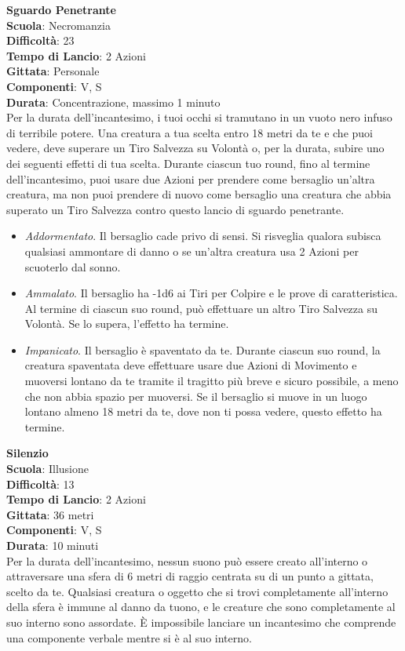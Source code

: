 \begin{multicols}{2}
\medskip\textbf{Sguardo Penetrante}\\
\textbf{Scuola}: Necromanzia\\
\textbf{Difficoltà}:  23\\
\textbf{Tempo di Lancio}: 2 Azioni\\
\textbf{Gittata}: Personale\\
\textbf{Componenti}: V, S\\
\textbf{Durata}: Concentrazione, massimo 1 minuto\\
Per la durata dell'incantesimo, i tuoi occhi si tramutano in un vuoto nero infuso di terribile potere. Una creatura a tua scelta entro 18 metri da te e che puoi vedere, deve superare un Tiro Salvezza su Volontà o, per la durata, subire uno dei seguenti effetti di tua scelta. Durante ciascun tuo round, fino al termine dell'incantesimo, puoi usare due Azioni per prendere come bersaglio un'altra creatura, ma non puoi prendere di nuovo come bersaglio una creatura che abbia superato un Tiro Salvezza contro questo lancio di sguardo penetrante.\\
\medskip
\begin{itemize}
\item
\textit{Addormentato}. Il bersaglio cade privo di sensi. Si risveglia qualora subisca qualsiasi ammontare di danno o se un'altra creatura usa 2 Azioni per scuoterlo dal sonno.
\item
\textit{Ammalato}. Il bersaglio ha -1d6 ai Tiri per Colpire e le prove di caratteristica. Al termine di ciascun suo round, può effettuare un altro Tiro Salvezza su Volontà. Se lo supera, l’effetto ha termine.
\item
\textit{Impanicato}. Il bersaglio è spaventato da te. Durante ciascun suo round, la creatura spaventata deve effettuare usare due Azioni di Movimento e muoversi lontano da te tramite il tragitto più breve e sicuro possibile, a meno che non abbia spazio per muoversi. Se il bersaglio si muove in un luogo lontano almeno 18 metri da te, dove non ti possa vedere, questo effetto ha termine.
\end{itemize}

\medskip\textbf{Silenzio}\\
\textbf{Scuola}: Illusione\\
\textbf{Difficoltà}:  13\\
\textbf{Tempo di Lancio}: 2 Azioni\\
\textbf{Gittata}: 36 metri\\
\textbf{Componenti}: V, S\\
\textbf{Durata}: 10 minuti\\
Per la durata dell'incantesimo, nessun suono può essere creato all'interno o attraversare una sfera di 6 metri di raggio centrata su di un punto a gittata, scelto da te. Qualsiasi creatura o oggetto che si trovi completamente all'interno della sfera è immune al danno da tuono, e le creature che sono completamente al suo interno sono assordate. È impossibile lanciare un incantesimo che comprende una componente verbale mentre si è al suo interno.


\end{multicols}
